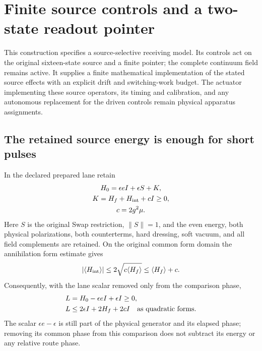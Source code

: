 \section{Finite source controls and a two-state readout pointer}
\label{sec:chvisd-finite-readout}

This construction specifies a source-selective receiving model. Its
controls act on the original sixteen-state source and a finite pointer;
the complete continuum field remains active. It supplies a finite
mathematical implementation of the stated source effects with an explicit
drift and switching-work budget. The actuator implementing these source
operators, its timing and calibration, and any autonomous replacement for
the driven controls remain physical apparatus assignments.

\subsection{The retained source energy is enough for short pulses}
\label{sec:chvisd-readout-form-energy}

In the declared prepared lane retain
\begin{equation}
\begin{gathered}
H_0=\epsilon eI+\epsilon S+K,\\
 K=H_f+H_{\rm int}+cI\geq0,\\
 c=2g^2\mu.
\end{gathered}
\label{eq:chvisd-readout-source-generator}
\end{equation}
Here $S$ is the original Swap restriction, $\|S\|=1$, and the even energy,
both physical polarizations, both counterterms, hard dressing, soft vacuum,
and all field complements are retained. On the original common form
domain the annihilation form estimate gives
\begin{equation}
 |\langle H_{\rm int}\rangle|
      \leq2\sqrt{c\langle H_f\rangle}
      \leq\langle H_f\rangle+c.
\end{equation}
Consequently, with the lane scalar removed only from the comparison phase,
\begin{equation}
 \begin{aligned}
 L&=H_0-\epsilon eI+\epsilon I\geq0,\\
 L&\leq2\epsilon I+2H_f+2cI
                   \quad\hbox{as quadratic forms}.
 \end{aligned}
 \label{eq:chvisd-readout-positive-form}
\end{equation}
The scalar $\epsilon e-\epsilon$ is still part of the physical generator
and its elapsed phase; removing its common phase from this comparison
does not subtract its energy or any relative route phase.

